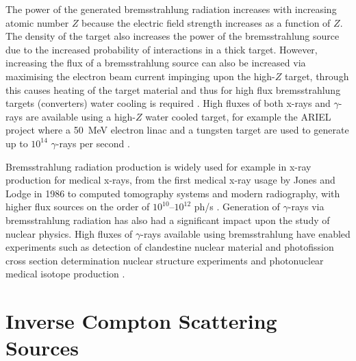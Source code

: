 \documentclass[../main.tex]{subfiles}
\begin{document}
The power of the generated bremsstrahlung radiation increases with increasing atomic number $Z$ because the electric field strength increases as a function of $Z$. The density of the target also increases the power of the bremsstrahlung source due to the increased probability of interactions in a thick target. However, increasing the flux of a bremsstrahlung source can also be increased via maximising the electron beam current impinging upon the high-$Z$ target, through this causes heating of the target material and thus for high flux bremsstrahlung targets (converters) water cooling is required \cite{auslender2004bremsstrahlung}. High fluxes of both x-rays and $\gamma$-rays are available using a high-$Z$ water cooled target, for example the ARIEL project \cite{dilling2013ariel} where a 50~\si{\mega\electronvolt} electron linac and a tungsten target are used to generate up to $10^{14}$ $\gamma$-rays per second \cite{lebois2011simulations}. 

Bremsstrahlung radiation production is widely used for example in x-ray production for medical x-rays, from the first medical x-ray usage by Jones and Lodge in 1986 \cite{jones1896discovery} to computed tomography systems \cite{hounsfield1973computerized,cormack1963representation,cormack1964representation} and modern radiography, with higher flux sources on the order of $10^{10}$--$10^{12}$ ph/\si{\second} \cite{behling2018diagnostic}. Generation of $\gamma$-rays via bremsstrahlung radiation has also had a significant impact upon the study of nuclear physics. High fluxes of $\gamma$-rays available using bremsstrahlung have enabled experiments such as detection of clandestine nuclear material \cite{pruet2006detecting,jones2008bremsstrahlung} and photofission cross section determination nuclear structure experiments \cite{dickey1975u,naik2011mass} and photonuclear medical isotope production \cite{danon2008medical}.

\section{Inverse Compton Scattering Sources}
\label{sec:intro_ICS}
\end{document}
